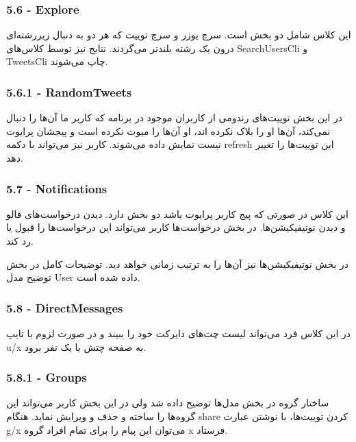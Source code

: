 \documentclass[12pt]{article}
\begin{document}
\LTR
\begin{latin}
\subsubsection*{5.6 - Explore}
\end{latin}
\RTL
این کلاس شامل دو بخش است. سرچ یوزر و سرچ توییت که هر دو به دنبال زیررشته‌ای درون یک رشته بلند‌تر می‌گردند. نتایج نیز توسط کلاس‌های SearchUsersCli و TweetsCli چاپ می‌شوند.

\LTR
\begin{latin}
\subsubsection*{5.6.1 - RandomTweets}
\end{latin}
\RTL
در این بخش توییت‌های رندومی از کاربران موجود در برنامه که کاربر ما آن‌ها را دنبال نمی‌کند، آن‌ها او را بلاک نکرده اند، او آن‌ها را میوت نکرده است و پیجشان پرایوت نیست نمایش داده می‌شوند. کاربر نیز می‌تواند با دکمه refresh این توییت‌ها را تغییر دهد.

\LTR
\begin{latin}
\subsubsection*{5.7 - Notifications}
\end{latin}
\RTL
این کلاس در صورتی که پیج کاربر پرایوت باشد دو بخش دارد. دیدن درخواست‌های فالو و دیدن نوتیفیکیشن‌ها. در بخش درخواست‌ها کاربر می‌تواند این درخواست‌ها را قبول یا رد کند.

در بخش نوتیفیکیشن‌ها نیز آن‌ها را به ترتیب زمانی خواهد دید. توضیحات کامل در بخش توضیح مدل User داده شده است.

\LTR
\begin{latin}
\subsubsection*{5.8 - DirectMessages}
\end{latin}
\RTL
در این کلاس فرد می‌تواند لیست چت‌های دایرکت خود را ببیند و در صورت لزوم با تایپ u/x به صفحه چتش با یک نفر برود.

\LTR
\begin{latin}
\subsubsection*{5.8.1 - Groups}
\end{latin}
\RTL
ساختار گروه در بخش مدل‌ها توضیح داده شد ولی در این بخش کاربر می‌تواند این گروه‌ها را ساخته و حذف و ویرایش نماید. هنگام share کردن توییت‌ها، با نوشتن عبارت g/x می‌توان این پیام را برای تمام افراد گروه x فرستاد.
\end{document}
